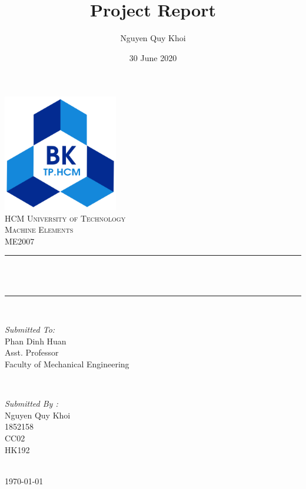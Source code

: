 \documentclass{presets}
\title{Project Report}
\author{Nguyen Quy Khoi}
\date{30 June 2020}
\makeatletter
\let\thetitle\@title
\makeatother
\begin{document}
		\begin{titlepage}
		\centering
		\includegraphics[width=5cm]{logo.png}\\[1.0 cm]
		\textsc{\LARGE HCM University of Technology}\\[1cm]
		\textsc{\Large Machine Elements}\\[0.5cm] %
		\textsc{\Large ME2007}\\[0.5 cm]
		\rule{\linewidth}{0.2 mm} \\[0.5 cm]
		{ \huge \bfseries \thetitle}\\
		\rule{\linewidth}{0.2 mm} \\[1.5 cm]
		
		\begin{minipage}{0.4\textwidth}
			\begin{flushleft} \large
				\emph{Submitted To:}\\
				Phan Dinh Huan\\
				Asst. Professor\\
				Faculty of Mechanical Engineering\\
			\end{flushleft}
		\end{minipage}~
		\begin{minipage}{0.4\textwidth}
			
			\begin{flushright} \large
				\emph{Submitted By :} \\
				Nguyen Quy Khoi\\
				1852158\\
				CC02\\
				HK192\\
			\end{flushright}
			
		\end{minipage}\\[1.5 cm]
		\mbox{}\vfill
		{\large \today}
	\end{titlepage}
\end{document}
